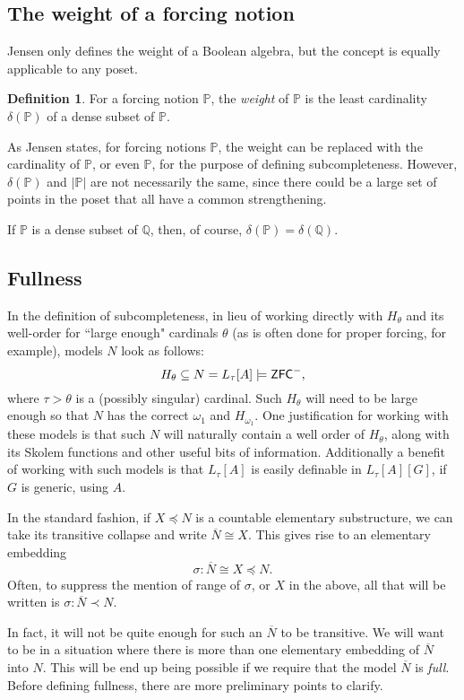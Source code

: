 \documentclass{amsart}
\theoremstyle{definition}
\newtheorem{definition}[theorem]{Definition}
\theoremstyle{remark}
\renewcommand{\P}{\mathbb{P}}
\newcommand{\Q}{\mathbb{Q}}
\newcommand{\N}{{\overline{N}}}
\newcommand{\ZFC}{\textup{\ensuremath{\textsf{ZFC}}}}
\begin{document}
\subsection{The weight of a forcing notion}
\label{subsec:delta}
Jensen only defines the weight of a Boolean algebra, but the concept is equally applicable to any poset.

\begin{definition} For a forcing notion $\P$, the \emph{weight} of \(\P\) is the least cardinality $\delta(\P)$ of a dense subset of $\P$. 
\end{definition}

As Jensen states, for forcing notions $\P$, the weight can be replaced with the cardinality of $\P$, or even $\P$, for the purpose of defining subcompleteness. However, $\delta(\P)$ and $|\P|$ are not necessarily the same, since there could be a large set of points in the poset that all have a common strengthening. 

If $\P$ is a dense subset of $\Q$, then, of course, $\delta(\P) = \delta(\Q)$.




\subsection{Fullness}
\label{subsec:fullness}
In the definition of subcompleteness, in lieu of working directly with $H_\theta$ and its well-order for ``large enough" cardinals $\theta$ (as is often done for proper forcing, for example), models $N$ look as follows: 
	$$H_\theta \subseteq N = L_\tau[A] \models \ZFC^-,$$
where $\tau>\theta$ is a (possibly singular) cardinal. Such $H_\theta$ will need to be large enough so that $N$ has the correct $\omega_1$ and $H_{\omega_1}$. One justification for working with these models is that such $N$ will naturally contain a well order of $H_\theta$, along with its Skolem functions and other useful bits of information. Additionally a benefit of working with such models is that $L_\tau[A]$ is easily definable in $L_\tau[A][G]$, if $G$ is generic, using $A$.

In the standard fashion, if $X \preccurlyeq N$ is a countable elementary substructure, we can take its transitive collapse and write $\N \cong X$. This gives rise to an elementary embedding 
$$\sigma: \N \cong X \preccurlyeq N.$$
Often, to suppress the mention of range of $\sigma$, or $X$ in the above, all that will be written is $\sigma: \N \prec N$.
	
In fact, it will not be quite enough for such an $\N$ to be transitive. We will want to be in a
situation where there is more than one elementary embedding of \(\N\) into \(N\).
This will be end up being possible if we require that the model \(\N\) is \emph{full}.
Before defining fullness, there are more preliminary points to clarify.
\end{document}
